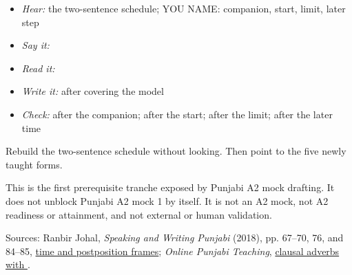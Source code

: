 \begin{itemize}
\raggedright
  \item \emph{Hear:} the two-sentence schedule; YOU NAME: companion, start, limit, later step
  \item \emph{Say it:} \textbf{               }
  \item \emph{Read it:} \textbf{               }
  \item \emph{Write it:} \textbf{               } after covering the model
  \item \emph{Check:} \textbf{} after the companion; \textbf{} after the start; \textbf{} after the limit; \textbf{ } after the later time
\end{itemize}

\begin{tcolorbox}[breakable,colback=teal!4,colframe=teal!35!black,title={Before you move on}]
Rebuild the two-sentence schedule without looking. Then point to the five newly taught forms.

This is the first prerequisite tranche exposed by Punjabi A2 mock drafting. It does not unblock Punjabi A2 mock 1 by itself. It is not an A2 mock, not A2 readiness or attainment, and not external or human validation.

Sources: Ranbir Johal, \emph{Speaking and Writing Punjabi} (2018), pp. 67–70, 76, and 84–85, \href{https://openlibrary-repo.ecampusontario.ca/jspui/bitstream/123456789/492/2/2018Pun1100CoursePackage.pdf}{time and postposition frames}; \emph{Online Punjabi Teaching}, \href{https://www.learnpunjabi.org/Adverb.html}{clausal adverbs with  }.
\end{tcolorbox}
